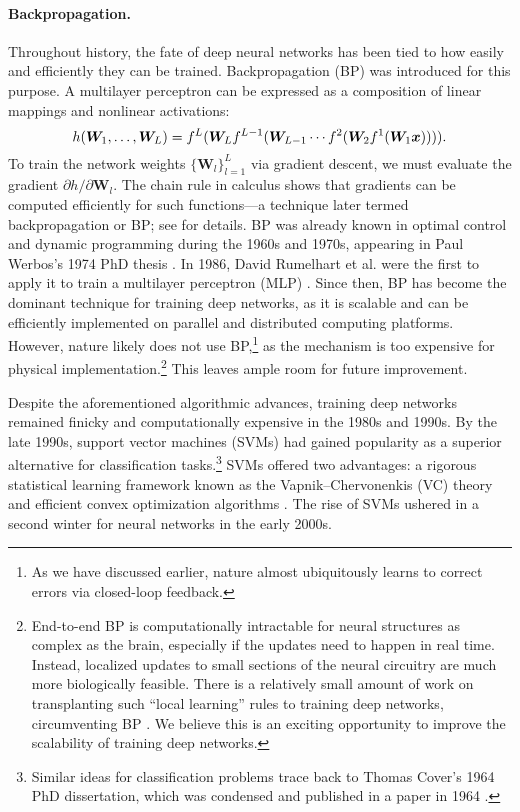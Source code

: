 \documentclass[../../book-main.tex]{subfiles}
\begin{document}
\paragraph{Backpropagation.}
Throughout history, the fate of deep neural networks has been tied to how easily and efficiently they can be trained. Backpropagation (BP) was introduced for this purpose. A multilayer perceptron can be expressed as a composition of linear mappings and nonlinear activations:
\begin{equation}
    h(\bm W_1, \ldots, \bm W_L) = f^L(\bm W_Lf^{L-1}(\bm W_{L-1} \cdots f^2(\bm W_2f^1(\bm W_1\bm{x})))).
\end{equation}
To train the network weights $\{\bm W_l\}_{l=1}^L$ via gradient descent, we must evaluate the gradient ${\partial h}/{\partial \bm W_l}$. The chain rule in calculus shows that gradients can be computed efficiently for such functions---a technique later termed backpropagation or BP; see  for details. BP was already known in optimal control and dynamic programming during the 1960s and 1970s, appearing in Paul Werbos's 1974 PhD thesis \cite{Werbos-1974, Werbos1994TheRO}. In 1986, David Rumelhart et al. were the first to apply it to train a multilayer perceptron (MLP) \cite{Rumelhart1986}. Since then, BP has become the dominant technique for training deep networks, as it is scalable and can be efficiently implemented on parallel and distributed computing platforms. However, nature likely does not use BP,\footnote{As we have discussed earlier, nature almost ubiquitously learns to correct errors via closed-loop feedback.} as the mechanism is too expensive for physical implementation.\footnote{End-to-end BP is computationally intractable for neural structures as complex as the brain, especially if the updates need to happen in real time. Instead, localized updates to small sections of the neural circuitry are much more biologically feasible. There is a relatively small amount of work on transplanting such ``local learning'' rules to training deep networks, circumventing BP \cite{baldi2016theory,li2025noprop}. We believe this is an exciting opportunity to improve the scalability of training deep networks.} This leaves ample room for future improvement.

Despite the aforementioned algorithmic advances, training deep networks remained finicky and computationally expensive in the 1980s and 1990s. By the late 1990s, support vector machines (SVMs) \cite{SVM-1995} had gained popularity as a superior alternative for classification tasks.\footnote{Similar ideas for classification problems trace back to Thomas Cover's 1964 PhD dissertation, which was condensed and published in a paper in 1964 \cite{Cover-1964}.} SVMs offered two advantages: a rigorous statistical learning framework known as the Vapnik--Chervonenkis (VC) theory and efficient convex optimization algorithms \cite{BoydVa04}. The rise of SVMs ushered in a second winter for neural networks in the early 2000s.
\end{document}
